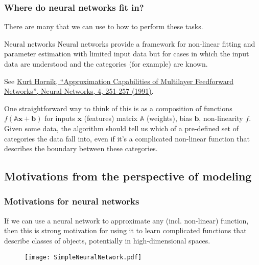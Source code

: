 \documentclass[hyperref={colorlinks=true}]{beamer}
\begin{document}
\begin{frame}%
  \frametitle{Where do neural networks fit in?}

  There are many  that we can use to  how to perform these tasks. 
  
  \mysp

  \begin{ucblock}{Neural networks}
  Neural networks provide a framework for non-linear fitting and parameter estimation with limited input data but for cases in which the input data are understood and the categories (for example) are known.  
  \end{ucblock}
  
  \mysp
    
  \begin{center}  \end{center}
  
  See \href{https://doi.org/10.1016/0893-6080(91)90009-T}{Kurt Hornik, ``Approximation Capabilities of Multilayer Feedforward Networks'', Neural Networks, 4, 251-257 (1991)}.
  
  \mysp
  
  One straightforward way to think of this is as a composition of functions $f(\mathbb{A}\mathbf{x}+\mathbf{b})$ for inputs $\mathbf{x}$ (features) matrix $\mathbb{A}$ (weights), bias $\mathbf{b}$, non-linearity $f$. Given some data, the algorithm should tell us which of a pre-defined set of categories the data fall into, even if it's a complicated non-linear function that describes the boundary between these categories.

  
\end{frame}
  
\subsection[Motivations from the perspective of modeling]{Motivations from the perspective of modeling}

\begin{frame}%
  \frametitle{Motivations for neural networks}

  If we can use a neural network to approximate any (incl. non-linear) function, then this is strong motivation for using it to learn complicated functions that describe classes of objects, potentially in high-dimensional spaces.

  \begin{figure}
    \centering
    \texttt{[image: SimpleNeuralNetwork.pdf]}
  \end{figure}
  
  
\end{frame}
\end{document}
